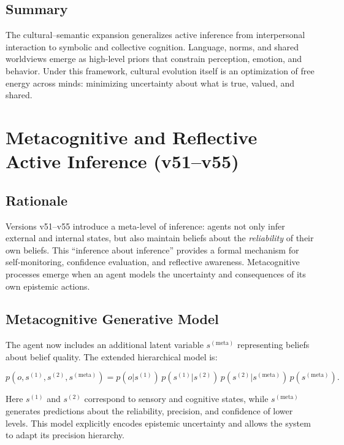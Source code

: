 \documentclass[9pt]{elife}
\begin{document}
\subsection{Summary}

The cultural–semantic expansion generalizes active inference
from interpersonal interaction to symbolic and collective cognition.
Language, norms, and shared worldviews emerge as
high-level priors that constrain perception, emotion, and behavior.
Under this framework, cultural evolution itself
is an optimization of free energy across minds:
minimizing uncertainty about what is true, valued, and shared.


\section{Metacognitive and Reflective Active Inference (v51–v55)}

\subsection{Rationale}

Versions v51–v55 introduce a meta-level of inference:
agents not only infer external and internal states,
but also maintain beliefs about the \emph{reliability} of their own beliefs.
This “inference about inference” provides a formal mechanism for
self-monitoring, confidence evaluation, and reflective awareness.
Metacognitive processes emerge when an agent models the
uncertainty and consequences of its own epistemic actions.

\subsection{Metacognitive Generative Model}

The agent now includes an additional latent variable
$s^{(\mathrm{meta})}$ representing beliefs about belief quality.
The extended hierarchical model is:

\[
p(o, s^{(1)}, s^{(2)}, s^{(\mathrm{meta})})
= p(o|s^{(1)}) \, p(s^{(1)}|s^{(2)}) \, p(s^{(2)}|s^{(\mathrm{meta})}) \, p(s^{(\mathrm{meta})}).
\]

Here $s^{(1)}$ and $s^{(2)}$ correspond to sensory and cognitive states,
while $s^{(\mathrm{meta})}$ generates predictions about
the reliability, precision, and confidence of lower levels.
This model explicitly encodes epistemic uncertainty and
allows the system to adapt its precision hierarchy.
\end{document}
